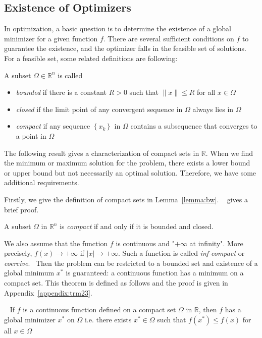 \subsection{Existence of Optimizers}
In optimization, a basic question is to determine the existence of a global minimizer for a given function $f$. There are several sufficient conditions on $f$ to guarantee the existence, and the optimizer falls in the feasible set of solutions. For a feasible set, some related definitions are following: 
\begin{defn}
    A subset $\Omega \in \mathbb{R}^n$ is called
    \begin{itemize}
        \item \emph{bounded} if there is a constant $R > 0$ such that $\|x\| \leq R$ for all $x \in \Omega$
        \item \emph{closed} if the limit point of any convergent sequence in $\Omega$ always lies in $\Omega$
        \item \emph{compact} if any sequence $\left\{x_{k}\right\}$ in $\Omega$ contains a subsequence that converges to a point in $\Omega$
    \end{itemize}
\end{defn}
\par The following result gives a characterization of compact sets in $\mathbb{R}$. When we find the minimum or maximum solution for the problem, there exists a lower bound or upper bound but not necessarily an optimal solution. Therefore, we have some additional requirements. 
\par Firstly, we give the definition of compact sets in Lemma~\ref{lemma:bw}. ~\citep{OG:17} gives a brief proof.
\begin{lemma}
    \label{lemma:bw}
    A subset $\Omega$ in $\mathbb{R}^n$ is \emph{compact} if and only if it is bounded and closed.
\end{lemma}
\par We also assume that the function $f$ is continuous and "$+\infty$ at infinity". More precisely, $f(x) \rightarrow+\infty$ if $|x| \rightarrow+\infty$. Such a function is called \emph{inf-compact} or \emph{coercive}.~\citep{JS:06} Then the problem can be restricted to a bounded set and existence of a global minimum $x^{*}$ is guaranteed: a continuous function has a minimum on a compact set. This theorem is defined as follows and the proof is given in Appendix~\ref{appendix:trm23}.
\begin{thm}~\citep{JS:06}
    \label{thm:23}
    If $f$ is a continuous function defined on a compact set $\Omega$ in $\mathbb{R}$, then $f$ has a global minimizer $x^{*}$ on $\Omega$ i.e. there exists $x^{*} \in \Omega$ such that $f\left(x^{*}\right) \leq f(x)$ for all $x \in \Omega$
\end{thm}
